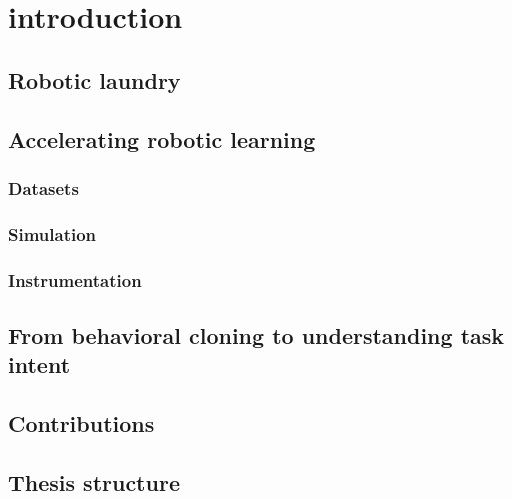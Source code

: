 \documentclass[\home/main.tex]{subfiles}
\begin{document}
\chapter{introduction}\label{introduction}


\section{Robotic laundry}
\section{Accelerating robotic learning}
\subsection{Datasets}
\subsection{Simulation}
\subsection{Instrumentation}
\section{From behavioral cloning to understanding task intent}
\section{Contributions}
\section{Thesis structure}
\end{document}
